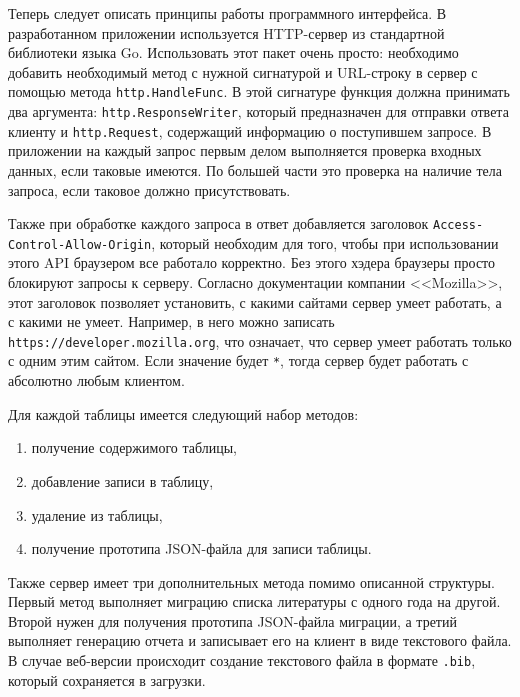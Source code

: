 Теперь следует описать принципы работы программного интерфейса. В разработанном приложении используется HTTP-сервер из стандартной
библиотеки языка Go. Использовать этот пакет очень просто: необходимо добавить необходимый метод с нужной сигнатурой и
URL-строку в сервер с помощью метода \texttt{http.HandleFunc}. В этой сигнатуре функция должна принимать два аргумента:
\texttt{http.ResponseWriter}, который предназначен для отправки ответа клиенту и \texttt{http.Request}, содержащий информацию
о поступившем запросе. В приложении на каждый запрос первым делом выполняется проверка входных данных, если таковые имеются.
По большей части это проверка на наличие тела запроса, если таковое должно присутствовать.

Также при обработке каждого запроса в ответ добавляется заголовок \texttt{Access-Control-Allow-Origin}, который необходим
для того, чтобы при использовании этого API браузером все работало корректно. Без этого хэдера браузеры просто блокируют запросы
к серверу. Согласно документации компании <<Mozilla>>\cite{Access-Control-Allow-Origin}, этот заголовок позволяет
установить, с какими сайтами сервер умеет работать, а с какими не умеет. Например, в него можно записать \texttt{https://developer.mozilla.org},
что означает, что сервер умеет работать только с одним этим сайтом. Если значение будет \texttt{*}, тогда сервер будет работать с абсолютно
любым клиентом.

Для каждой таблицы имеется следующий набор методов:

\begin{enumerate}
    \item получение содержимого таблицы,
    \item добавление записи в таблицу,
    \item удаление из таблицы,
    \item получение прототипа JSON-файла для записи таблицы.
\end{enumerate}

Также сервер имеет три дополнительных метода помимо описанной структуры. 
Первый метод выполняет миграцию списка литературы с одного года на другой.
Второй нужен для получения прототипа JSON-файла миграции, а третий выполняет генерацию отчета
и записывает его на клиент в виде текстового файла. В случае веб-версии происходит создание текстового файла в формате \texttt{.bib}, который
сохраняется в загрузки.